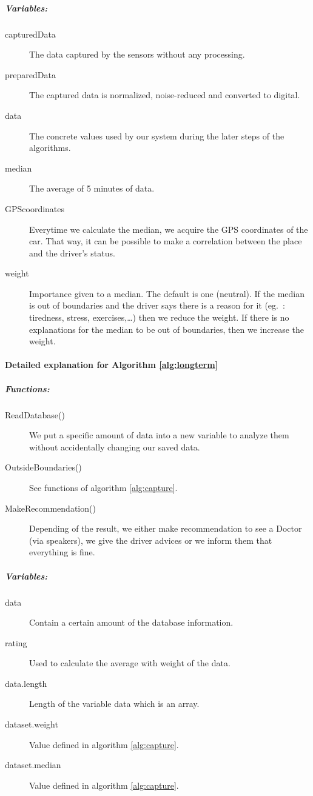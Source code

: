 \subparagraph{Variables:}
\begin{description}
	\item [capturedData] The data captured by the sensors without any processing.
	\item [preparedData] The captured data is normalized, noise-reduced and converted to digital.
	\item [data] The concrete values used by our system during the later steps of the algorithms.
	\item [median] The average of 5 minutes of data.
	\item [GPScoordinates] Everytime we calculate the median, we acquire the GPS coordinates of the car. That way, it can be possible to make a correlation between the place and the driver's status.
	\item [weight] Importance given to a median. The default is one (neutral). If the median is out of boundaries and the driver says there is a reason for it (eg. : tiredness, stress, exercises,\dots ) then we reduce the weight. If there is no explanations for the median to be out of boundaries, then we increase the weight.
	
	
\end{description}
\paragraph{Detailed explanation for Algorithm \ref{alg:longterm}}
\subparagraph{Functions:}
\begin{description}
	\item [ReadDatabase()] We put a specific amount of data into a new variable to analyze them without accidentally changing our saved data.
	\item [OutsideBoundaries()] See functions of algorithm \ref{alg:capture}.
	\item [MakeRecommendation()] Depending of the result, we either make recommendation to see a Doctor (via speakers), we give the driver advices or we inform them that everything is fine.
\end{description}
\subparagraph{Variables:}
\begin{description}
	\item [data] Contain a certain amount of the database information.
	\item [rating] Used to calculate the average with weight of the data.
	\item [data.length] Length of the variable data which is an array.
	\item [dataset.weight] Value defined in algorithm \ref{alg:capture}.
	\item [dataset.median] Value defined in algorithm \ref{alg:capture}.
\end{description}
\newpage
